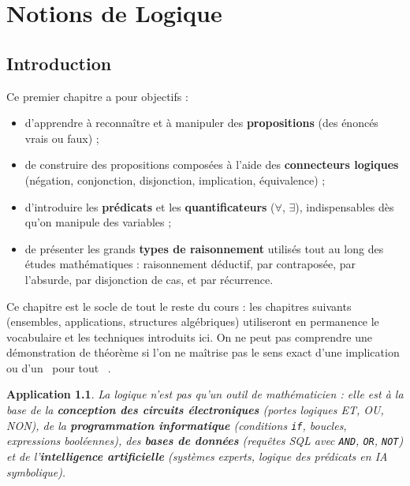 \documentclass[a4paper,12pt,openany]{book}
\providecommand{\og}{\guillemotleft~}
\providecommand{\fg}{\ifhmode~\fi\guillemotright}
\newtheorem{application}{Application}[section]
\begin{document}
\tableofcontents

%

\chapter{Notions de Logique}

\section{Introduction}


Ce premier chapitre a pour objectifs :
\begin{itemize}
  \item d'apprendre à reconnaître et à manipuler des \textbf{propositions} (des
  énoncés vrais ou faux) ;
  \item de construire des propositions composées à l'aide des
  \textbf{connecteurs logiques} (négation, conjonction, disjonction,
  implication, équivalence) ;
  \item d'introduire les \textbf{prédicats} et les \textbf{quantificateurs}
  ($\forall$, $\exists$), indispensables dès qu'on manipule des variables ;
  \item de présenter les grands \textbf{types de raisonnement} utilisés tout au
  long des études mathématiques : raisonnement déductif, par contraposée, par
  l'absurde, par disjonction de cas, et par récurrence.
\end{itemize}

Ce chapitre est le socle de tout le reste du cours : les chapitres suivants
(ensembles, applications, structures algébriques) utiliseront en permanence le
vocabulaire et les techniques introduits ici. On ne peut pas comprendre une
démonstration de théorème si l'on ne maîtrise pas le sens exact d'une
implication ou d'un \og pour tout \fg{}.

\begin{application}
La logique n'est pas qu'un outil de mathématicien : elle est à la base de la
\textbf{conception des circuits électroniques} (portes logiques ET, OU, NON),
de la \textbf{programmation informatique} (conditions \texttt{if}, boucles,
expressions booléennes), des \textbf{bases de données} (requêtes SQL avec
\texttt{AND}, \texttt{OR}, \texttt{NOT}) et de l'\textbf{intelligence
artificielle} (systèmes experts, logique des prédicats en IA symbolique).
\end{application}
\end{document}
